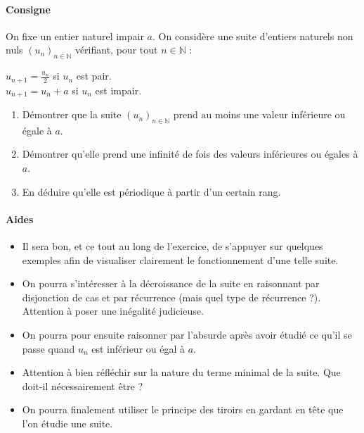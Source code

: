 \documentclass[a4paper]{report}
\newcounter{exnumber}
\begin{document}
				\begin{tcolorbox}[colback=white,colframe=black,title=Exercice n°\arabic{exnumber} - Une suite périodique]
				\paragraph{Consigne}
					On fixe un entier naturel impair $a$. On considère une suite d'entiers naturels non nuls $(u_n)_{n \in \mathbb{N}}$ vérifiant, pour tout $n \in \mathbb{N}$ :
					\vspace{3mm}
					\begin{center}
						$u_{n+1} = \frac{u_n}{2}$ si $u_n$ est pair.\\
						\vspace{1mm}
						$u_{n+1} = u_n + a$ si $u_n$ est impair.
					\end{center}
					\begin{enumerate}
					
						\item Démontrer que la suite $(u_n)_{n \in \mathbb{N}}$ prend au moins une valeur inférieure ou égale à $a$.
						\item Démontrer qu'elle prend une infinité de fois des valeurs inférieures ou égales à $a$.
						\item En déduire qu'elle est périodique à partir d'un certain rang.
					\end{enumerate}
					
				\tcblower					
					
				\paragraph{Aides}
					\begin{itemize}
						\item Il sera bon, et ce tout au long de l'exercice, de s'appuyer sur quelques exemples afin de visualiser clairement le fonctionnement d'une telle suite.
						\item On pourra s'intéresser à la décroissance de la suite en raisonnant par disjonction de cas et par récurrence (mais quel type de récurrence ?). Attention à poser une inégalité judicieuse.
						\item On pourra pour ensuite raisonner par l'absurde après avoir étudié ce qu'il se passe quand $u_n$ est inférieur ou égal à $a$.
						\item Attention à bien réfléchir sur la nature du terme minimal de la suite. Que doit-il nécessairement être ?
						\item On pourra finalement utiliser le principe des tiroirs en gardant en tête que l'on étudie une suite.
					\end{itemize}
				\end{tcolorbox}
				\addtocounter{exnumber}{1}
		
\end{document}
